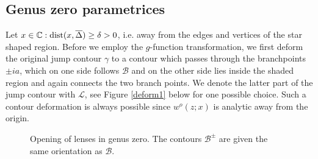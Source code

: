 \documentclass[10pt,oneside,reqno]{amsart}
\numberwithin{equation}{section}
\begin{document}
\subsection{Genus zero parametrices}\label{RHP0} Let $x\in\mathbb{C}:\textnormal{dist}(x,\overline{\Delta})\geq\delta>0$, i.e. away from the edges and vertices of the star shaped region. 
Before we employ the $g$-function transformation, we first deform the original jump contour $\gamma$ to a contour which passes through
the branchpoints $\pm ia$, which on one side follows $\mathcal{B}$ and on the other side lies inside the shaded region and again connects the two branch points. We denote the latter part of the
jump contour with $\mathcal{L}$, see Figure \ref{deform1} below for one possible choice. Such a contour deformation is always possible since $w^o(z;x)$ is analytic away from
the origin.
\begin{figure}[tbh]
\begin{center}
\resizebox{0.3\textwidth}{!}{}\hspace{2cm} \resizebox{0.3\textwidth}{!}{}
\begin{minipage}{0.5\textwidth}
\caption{Deformation of the jump contour $\gamma$ to the union of $\mathcal{B}\cup\mathcal{L}$. 
The branchcut $\mathcal{B}$ is indicated in red and $\mathcal{L}$ in black. The picture corresponds to one possible choice of $x\in\mathbb{C}:\textnormal{dist}(x,\overline{\Delta})\geq\delta>0$
with $\Re x<0$ and $\Im x>0$.}
\label{deform1}
\end{minipage}
\begin{minipage}{0.49\textwidth}
\caption{Opening of lenses in genus zero. The contours $\mathcal{B}^{\pm}$ are given the same orientation as $\mathcal{B}$.}
\label{open1}
\end{minipage}
\end{center}
\end{figure}
\end{document}
